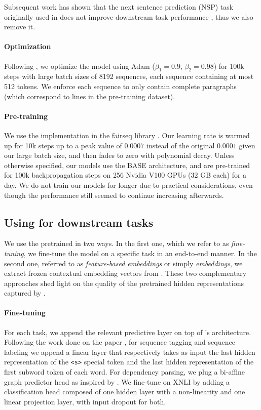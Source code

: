 Subsequent work has shown that the next sentence prediction (NSP) task originally used in \bert does not improve downstream task performance \citep{conneau-lample-2019-cross,liu-etal-2019-roberta}, thus we also remove it.

\paragraph{Optimization}
Following \citep{liu-etal-2019-roberta}, we optimize the model using Adam \citep{kingma-ba-2015-adam} ($\beta_1 = 0.9$, $\beta_2 = 0.98$) for 100k steps with large batch sizes of 8192 sequences, each sequence containing at most 512 tokens. We enforce each sequence to only contain complete paragraphs (which correspond to lines in the pre-training dataset).

\paragraph{Pre-training}
We use the \roberta implementation in the fairseq library \citep{ott-etal-2019-fairseq}. Our learning rate is warmed up for 10k steps up to a peak value of $0.0007$ instead of the original $0.0001$ given our large batch size, and then fades to zero with polynomial decay. Unless otherwise specified, our models use the BASE architecture, and are pre-trained for 100k backpropagation steps on 256 Nvidia V100 GPUs (32 GB each) for a day. We do not train our models for longer due to practical considerations, even though the performance still seemed to continue increasing afterwards.

\subsection{Using \camembert for downstream tasks}
We use the pretrained \camembert in two ways. In the first one, which we refer to as \textit{fine-tuning}, we fine-tune the model on a specific task in an end-to-end manner. In the second one, referred to as \textit{feature-based embeddings} or simply \textit{embeddings}, we extract frozen contextual embedding vectors from \camembert.
These two complementary approaches shed light on the quality of the pretrained hidden representations captured by \camembert.


\paragraph{Fine-tuning}
For each task, we append the relevant predictive layer on top of \camembert's  architecture. Following the work done on the \bert paper \citep{devlin-etal-2019-bert}, for sequence tagging and sequence labeling we append a linear layer that respectively takes as input the last hidden representation of the \texttt{<s>} special token and the last hidden representation of the first subword token of each word. For dependency parsing, we plug a bi-affine graph predictor head as inspired by \citet{dozat-manning-2017-deep}. We fine-tune on XNLI by adding a classification head composed of one hidden layer with a non-linearity and one linear projection layer, with input dropout for both.

